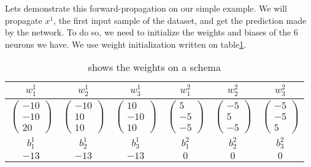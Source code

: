 		\vskip 1cm
		Lets demonstrate this forward-propagation on our simple example. We will propagate $x^1$, the first input sample of the dataset, and get the prediction made by the network. To do so, we need to initialize the weights and biases of the 6 neurons we have. We use weight initialization written on table\ref{tab:NN_weights}.

		\begin{table}[h]
			\centering
			\begin{tabular}{c|c|c||c|c|c}
				$w^1_1$ & $w^1_2$ & $w^1_3$ & $w^2_1$ & $w^2_2$ & $w^2_3$ \\
				\hline
					$ \left( \begin{matrix} -10  \\ -10  \\  20 \end{matrix}\right) $ &
					$ \left( \begin{matrix} -10  \\  10  \\  10 \end{matrix}\right) $ &
					$ \left( \begin{matrix}  10  \\ -10  \\  10 \end{matrix}\right) $ &
					$ \left( \begin{matrix}  5   \\ -5   \\ -5  \end{matrix}\right) $ &
					$ \left( \begin{matrix} -5   \\  5   \\ -5  \end{matrix}\right) $ &
					$ \left( \begin{matrix} -5   \\ -5   \\  5  \end{matrix}\right) $ \\
				\hline
				\hline
				$b^1_1$ & $b^1_2$ & $b^1_3$ & $b^2_1$ & $b^2_2$ & $b^2_3$ \\
				$-13$   & $-13$   & $-13$   & $0$     & $0$     & $0$     \\
			\end{tabular}
			\caption{  shows the weights on a schema}
			\label{tab:NN_weights}
		\end{table}


